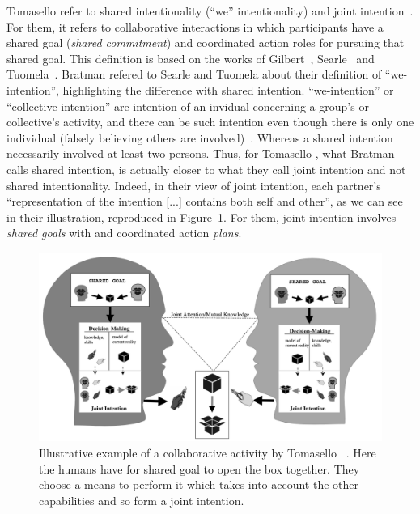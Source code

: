 \documentclass[a4paper,11pt,twoside]{StyleThese}
\begin{document}
Tomasello \etal{} refer to shared intentionality (``we'' intentionality) and joint intention~\cite{tomasello_2005_understanding}. For them, it refers to collaborative interactions in which participants have a shared goal (\textit{shared commitment}) and coordinated action roles for pursuing that shared goal. This definition is based on the works of Gilbert~\cite{gilbert_1989_social}, Searle~\cite{searle_1983_intentionality} and Tuomela~\cite{tuomela_1995_importance}. Bratman refered to Searle and Tuomela about their definition of ``we-intention'', highlighting the difference with shared intention. ``we-intention'' or ``collective intention'' are intention of an invidual concerning a group's or collective's activity, and there can be such intention even though there is only one individual (falsely believing others are involved)~\cite{bratman_1993_shared}. Whereas a shared intention necessarily involved at least two persons. Thus, for Tomasello \etal, what Bratman calls shared intention, is actually closer to what they call joint intention and not shared intentionality. Indeed, in their view of joint intention, each partner's ``representation of the intention [...] contains both self and other'', as we can see in their illustration, reproduced in Figure~\ref{chap1:fig:ji}. For them, joint intention involves \textit{shared goals} with and coordinated action \textit{plans}. 

 \begin{figure}[!ht]
 	\includegraphics[width=\linewidth]{figures/chapter1/shared_representation.png}
 	\caption{Illustrative example of a collaborative activity by Tomasello \etal~\cite{tomasello_2005_understanding}. Here the humans have for shared goal to open the box together. They choose a means to perform it which takes into account the other capabilities and so form a joint	intention.}
 	\label{chap1:fig:ji}
 \end{figure}
\end{document}
